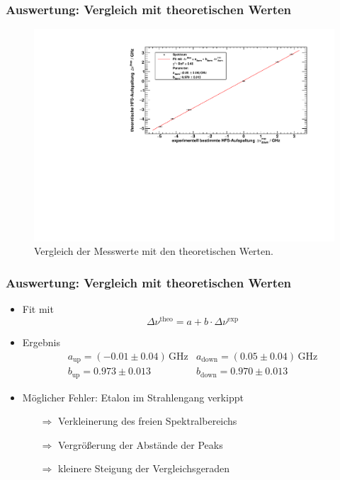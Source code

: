\begin{frame}
\frametitle{Auswertung: Vergleich mit theoretischen Werten}
\begin{figure}
\begin{center}
    \includegraphics[width=\textwidth]{../img/down-spectrum.pdf}
    \caption{Vergleich der Messwerte mit den theoretischen Werten.}
\end{center}
\end{figure}
\end{frame}


\begin{frame}
\frametitle{Auswertung: Vergleich mit theoretischen Werten}
\begin{itemize}[<+->]
    \item Fit mit
    \begin{equation*}
        \Delta \nu^\text{theo} = a + b \cdot \Delta \nu^\text{exp}
    \end{equation*}
    \item Ergebnis
    \begin{equation*}
        \begin{array}{ll}
            a_\text{up} = (-0.01 \pm 0.04)\,\text{GHz} & a_\text{down} = (0.05 \pm 0.04)\,\text{GHz} \\
            b_\text{up} = 0.973 \pm 0.013 & b_\text{down} = 0.970 \pm 0.013
        \end{array}
    \end{equation*}
    \item Möglicher Fehler: Etalon im Strahlengang verkippt
    \begin{itemize}[<+->]
        \item[$\Rightarrow$] Verkleinerung des freien Spektralbereichs
        \item[$\Rightarrow$] Vergrößerung der Abstände der Peaks
        \item[$\Rightarrow$] kleinere Steigung der Vergleichsgeraden
    \end{itemize}
\end{itemize}
\end{frame}

